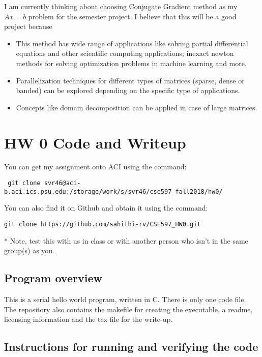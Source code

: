 \documentclass{article}
\begin{document}
\begin{spacing}{1.1}
I am currently thinking about choosing Conjugate Gradient method as my $Ax=b$ problem for the semester project. I believe that this will be a good project because
\begin{itemize}
  \item This method has wide range of applications like solving partial differential equations and other scientific computing applications; inexact newton methods for solving optimization problems in machine learning and more.
  \item Parallelization techniques for different types of matrices (sparse, dense or banded) can be explored depending on the specific type of applications.
    \item Concepts like domain decomposition can be applied in case of large matrices.
\end{itemize}


\section{HW 0 Code and Writeup}

You can get my assignment onto ACI using the command:

\begin{verbatim}
 git clone svr46@aci-b.aci.ics.psu.edu:/storage/work/s/svr46/cse597_fall2018/hw0/
\end{verbatim}

You can also find it on Github and obtain it using the command:

\begin{verbatim}
git clone https://github.com/sahithi-rv/CSE597_HW0.git
\end{verbatim}

* Note, test this with us in class or with another person who isn't in the same group(s) as you.

\subsection{Program overview}

This is a serial hello world program, written in C. There is only one code file. The repository also contains the makefile for creating the executable, a readme, licensing information and the tex file for the write-up.


\subsection{Instructions for running and verifying the code}


\end{spacing}
\end{document}

